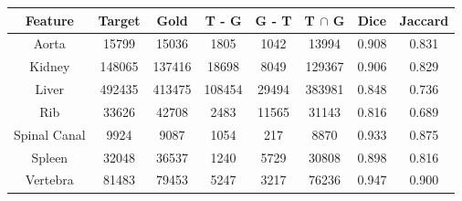 \begin{center}
\begin{tabular}{cccccccc}
\scriptsize \textbf{Feature} & \scriptsize \textbf{Target} & \scriptsize \textbf{Gold} & \scriptsize \textbf{T - G} & \scriptsize \textbf{G - T} & \scriptsize \textbf{T $\cap$ G} & \scriptsize \textbf{Dice} & \scriptsize \textbf{Jaccard} \\
\hline
\scriptsize Aorta & \scriptsize 15799 & \scriptsize 15036 & \scriptsize 1805 & \scriptsize 1042 & \scriptsize 13994 & \scriptsize 0.908 & \scriptsize 0.831 \\
\scriptsize Kidney & \scriptsize 148065 & \scriptsize 137416 & \scriptsize 18698 & \scriptsize 8049 & \scriptsize 129367 & \scriptsize 0.906 & \scriptsize 0.829 \\
\scriptsize Liver & \scriptsize 492435 & \scriptsize 413475 & \scriptsize 108454 & \scriptsize 29494 & \scriptsize 383981 & \scriptsize 0.848 & \scriptsize 0.736 \\
\scriptsize Rib & \scriptsize 33626 & \scriptsize 42708 & \scriptsize 2483 & \scriptsize 11565 & \scriptsize 31143 & \scriptsize 0.816 & \scriptsize 0.689 \\
\scriptsize Spinal Canal & \scriptsize 9924 & \scriptsize 9087 & \scriptsize 1054 & \scriptsize 217 & \scriptsize 8870 & \scriptsize 0.933 & \scriptsize 0.875 \\
\scriptsize Spleen & \scriptsize 32048 & \scriptsize 36537 & \scriptsize 1240 & \scriptsize 5729 & \scriptsize 30808 & \scriptsize 0.898 & \scriptsize 0.816 \\
\scriptsize Vertebra & \scriptsize 81483 & \scriptsize 79453 & \scriptsize 5247 & \scriptsize 3217 & \scriptsize 76236 & \scriptsize 0.947 & \scriptsize 0.900 \\
\end{tabular}
\end{center}

